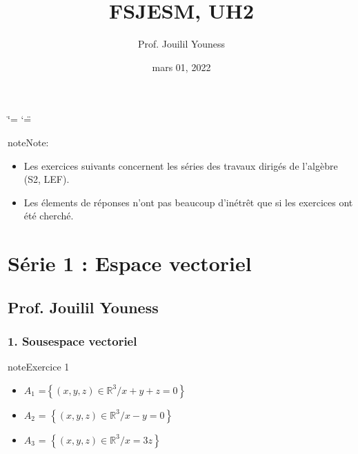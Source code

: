 \documentclass[letterpaper,10pt,french]{jupyterBook}
\title{FSJESM, UH2}
\date{mars 01, 2022}
\author{Prof.\@{} Jouilil Youness}
\begin{document}
\ifdefined\shorthandoff
  \ifnum\catcode`\=\string=\active\shorthandoff{=}\fi
  \ifnum\catcode`\"=\active{}\fi
\fi

\pagestyle{empty}
\sphinxmaketitle
\pagestyle{plain}
\sphinxtableofcontents
\pagestyle{normal}
\label{\detokenize{intro::doc}}


\begin{sphinxadmonition}{note}{Note:}\begin{itemize}
\item {} 
\sphinxAtStartPar
Les exercices suivants concernent les séries des travaux dirigés de l’algèbre (S2, LEF).

\item {} 
\sphinxAtStartPar
Les élements de réponses n’ont pas beaucoup d’inétrêt que si les exercices ont été cherché.

\end{itemize}
\end{sphinxadmonition}


\chapter{Série 1 : Espace vectoriel}
\label{\detokenize{S_xe9rie1:serie-1-espace-vectoriel}}\label{\detokenize{S_xe9rie1::doc}}

\section{Prof. Jouilil Youness}
\label{\detokenize{S_xe9rie1:prof-jouilil-youness}}

\subsection{1. Sous\sphinxhyphen{}espace vectoriel}
\label{\detokenize{S_xe9rie1:sous-espace-vectoriel}}
\begin{sphinxadmonition}{note}{Exercice 1}

\sphinxAtStartPar
{}
\begin{itemize}
\item {} 
\sphinxAtStartPar
\(A_1\) =\( \left\{ (x,y,z) \in \mathbb{R}^3 / x+y+z = 0 \right\}\)

\item {} 
\sphinxAtStartPar
\(A_2\) = \( \left\{ (x,y,z) \in \mathbb{R}^3 / x-y = 0 \right\}\)

\item {} 
\sphinxAtStartPar
\(A_3\) = \( \left\{ (x,y,z) \in \mathbb{R}^3 / x =3z \right\}\)

\end{itemize}
\end{sphinxadmonition}
\end{document}
